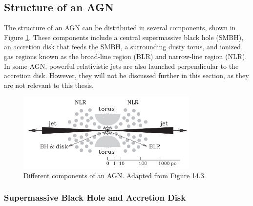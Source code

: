\subsection{Structure of an AGN}

The structure of an AGN can be distributed in several components, shown in Figure \ref{fig:agn_structure_mo}. These components include a central supermassive black hole (SMBH), an accretion disk that feeds the SMBH, a surrounding dusty torus, and ionized gas regions known as the broad-line region (BLR) and narrow-line region (NLR). In some AGN, powerful relativistic jets are also launched perpendicular to the accretion disk. However, they will not be discussed further in this section, as they are not relevant to this thesis.

\begin{figure}[!ht]
	\centering
	\includegraphics[width=0.8\textwidth]{pictures/Chapter2/AGN_standard_paradigm.png}
	\caption{Different components of an AGN. Adapted from \textcite{mo2010galaxy} Figure 14.3.}
	\label{fig:agn_structure_mo}
\end{figure}

\subsubsection{Supermassive Black Hole and Accretion Disk}

